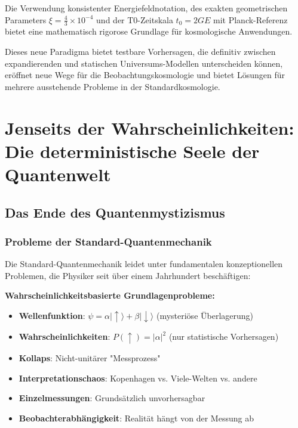 \documentclass[12pt,a4paper]{report}
\newcommand{\tzero}{t_0}                  %
\begin{document}
	Die Verwendung konsistenter Energiefeldnotation, des exakten geometrischen Parameters $\xi = \frac{4}{3} \times 10^{-4}$ und der T0-Zeitskala $\tzero = 2GE$ mit Planck-Referenz bietet eine mathematisch rigorose Grundlage für kosmologische Anwendungen.
	
	Dieses neue Paradigma bietet testbare Vorhersagen, die definitiv zwischen expandierenden und statischen Universums-Modellen unterscheiden können, eröffnet neue Wege für die Beobachtungskosmologie und bietet Lösungen für mehrere ausstehende Probleme in der Standardkosmologie.
	
	\chapter{Jenseits der Wahrscheinlichkeiten: Die deterministische Seele der Quantenwelt}
	\label{chap:deterministic_qm}
	
	\section{Das Ende des Quantenmystizismus}
	\label{sec:end_quantum_mysticism}
	
	\subsection{Probleme der Standard-Quantenmechanik}
	\label{subsec:standard_qm_problems}
	
	Die Standard-Quantenmechanik leidet unter fundamentalen konzeptionellen Problemen, die Physiker seit über einem Jahrhundert beschäftigen:
	
	\begin{tcolorbox}[colback=red!5!white,colframe=red!75!black,title=Probleme der Standard-QM]
		\textbf{Wahrscheinlichkeitsbasierte Grundlagenprobleme:}
		\begin{itemize}
			\item \textbf{Wellenfunktion}: $\psi = \alpha|\uparrow\rangle + \beta|\downarrow\rangle$ (mysteriöse Überlagerung)
			\item \textbf{Wahrscheinlichkeiten}: $P(\uparrow) = |\alpha|^2$ (nur statistische Vorhersagen)
			\item \textbf{Kollaps}: Nicht-unitärer "Messprozess"
			\item \textbf{Interpretationschaos}: Kopenhagen vs. Viele-Welten vs. andere
			\item \textbf{Einzelmessungen}: Grundsätzlich unvorhersagbar
			\item \textbf{Beobachterabhängigkeit}: Realität hängt von der Messung ab
		\end{itemize}
	\end{tcolorbox}
	
\end{document}
